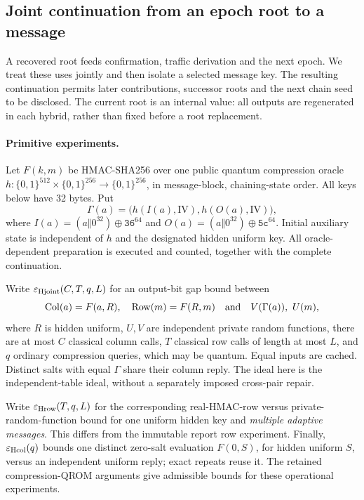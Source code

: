 \subsection{Joint continuation from an epoch root to a message}
\label{sec:joint-continuation}

A recovered root feeds confirmation, traffic derivation and the next epoch.
We treat these uses jointly and then isolate a selected message key.
The resulting continuation permits later contributions, successor roots and
the next chain seed to be disclosed. The current root is an internal value:
all outputs are regenerated in each hybrid, rather than fixed before a
root replacement.

\paragraph{Primitive experiments.}
Let $F(k,m)$ be HMAC-SHA256 over one public quantum compression oracle
$h:\{0,1\}^{512}\times\{0,1\}^{256}\to\{0,1\}^{256}$, in message-block,
chaining-state order. All keys below have 32 bytes. Put
\[
 \Gamma(a)=\bigl(h(I(a),\mathrm{IV}),h(O(a),\mathrm{IV})\bigr),
\]
where $I(a)=(a\Vert0^{32})\oplus\mathtt{36}^{64}$ and
$O(a)=(a\Vert0^{32})\oplus\mathtt{5c}^{64}$.
Initial auxiliary state is independent of $h$ and the designated hidden
uniform key. All oracle-dependent preparation is executed and counted,
together with the complete continuation.

Write $\varepsilon_{\rm Hjoint}(C,T,q,L)$ for an output-bit gap bound between
\[
 \operatorname{Col}(a)=F(a,R),\quad
 \operatorname{Row}(m)=F(R,m)
 \quad\hbox{and}\quad
 V(\Gamma(a)),\ U(m),
\]
where $R$ is hidden uniform, $U,V$ are independent private random functions,
there are at most $C$ classical column calls, $T$ classical row calls of
length at most $L$, and $q$ ordinary compression queries, which may be
quantum. Equal inputs are cached. Distinct salts with equal $\Gamma$ share
their column reply. The ideal here is the independent-table ideal, without
a separately imposed cross-pair repair.

Write $\varepsilon_{\rm Hrow}(T,q,L)$ for the corresponding real-HMAC-row
versus private-random-function bound for one uniform hidden key and
\emph{multiple adaptive messages}. This differs from the immutable report
row experiment. Finally, $\varepsilon_{\rm Hcol}(q)$ bounds one distinct
zero-salt evaluation $F(0,S)$, for hidden uniform $S$, versus an independent
uniform reply; exact repeats reuse it. The retained compression-QROM
arguments give admissible bounds for these operational experiments.

